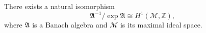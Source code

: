 
There exists a natural isomorphism
$$\mathfrak{A}^{-1} / \exp \mathfrak{A} \cong H^1(\mathcal{M}, \mathbb{Z}),$$
where $\mathfrak{A}$ is a Banach algebra and $\mathcal{M}$ is its maximal ideal space.
